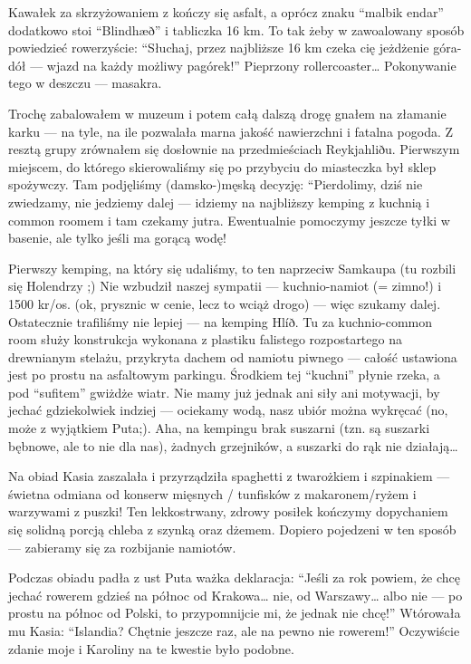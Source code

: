 Kawałek za skrzyżowaniem  z  kończy się asfalt, a oprócz znaku “malbik endar” dodatkowo stoi “Blindhæð” i tabliczka 16 km. To tak żeby w zawoalowany sposób powiedzieć rowerzyście: “Słuchaj, przez najbliższe 16 km czeka cię jeżdżenie góra-dół --- wjazd na każdy możliwy pagórek!” Pieprzony rollercoaster… Pokonywanie tego w deszczu --- masakra.


Trochę zabalowałem w muzeum i potem całą dalszą drogę gnałem na złamanie karku --- na tyle, na ile pozwalała marna jakość nawierzchni i fatalna pogoda. Z resztą grupy zrównałem się dosłownie na przedmieściach Reykjahliðu. Pierwszym miejscem, do którego skierowaliśmy się po przybyciu do miasteczka był sklep spożywczy. Tam podjęliśmy (damsko-)męską decyzję: “Pierdolimy, dziś nie zwiedzamy, nie jedziemy dalej --- idziemy na najbliższy kemping z kuchnią i common roomem i tam czekamy jutra. Ewentualnie pomoczymy jeszcze tyłki w basenie, ale tylko jeśli ma gorącą wodę!

Pierwszy kemping, na który się udaliśmy, to ten naprzeciw Samkaupa  (tu rozbili się Holendrzy ;) Nie wzbudził naszej sympatii --- kuchnio-namiot (= zimno!) i 1500 kr/os. (ok, prysznic w cenie, lecz to wciąż drogo) --- więc szukamy dalej. Ostatecznie trafiliśmy nie lepiej --- na kemping Hlíð. Tu za kuchnio-common room służy konstrukcja wykonana z plastiku falistego rozpostartego na drewnianym stelażu, przykryta dachem od namiotu piwnego --- całość ustawiona jest po prostu na asfaltowym parkingu. Środkiem tej “kuchni” płynie rzeka, a pod “sufitem” gwiżdże wiatr. Nie mamy już jednak ani siły ani motywacji, by jechać gdziekolwiek indziej --- ociekamy wodą, nasz ubiór można wykręcać (no, może z wyjątkiem Puta;). Aha, na kempingu brak suszarni (tzn. są suszarki bębnowe, ale to nie dla nas), żadnych grzejników, a suszarki do rąk nie działają…

Na obiad Kasia zaszalała i przyrządziła spaghetti z twarożkiem i szpinakiem --- świetna odmiana od konserw mięsnych / tunfisków z makaronem/ryżem i warzywami z puszki! Ten lekkostrwany, zdrowy posiłek kończymy dopychaniem się solidną porcją chleba z szynką oraz dżemem. Dopiero pojedzeni w ten sposób --- zabieramy się za rozbijanie namiotów.


Podczas obiadu padła z ust Puta ważka deklaracja: “Jeśli za rok powiem, że chcę jechać rowerem gdzieś na północ od Krakowa… nie, od Warszawy… albo nie --- po prostu na północ od Polski, to przypomnijcie mi, że jednak nie chcę!” Wtórowała mu Kasia: “Islandia? Chętnie jeszcze raz, ale na pewno nie rowerem!” Oczywiście zdanie moje i Karoliny na te kwestie było podobne.

